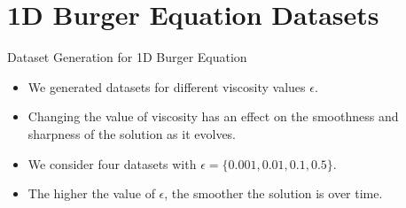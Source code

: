 \section{1D Burger Equation Datasets}

\begin{secframe}

\begin{block}{Dataset Generation for 1D Burger Equation}
\begin{itemize}
    \item We generated datasets for different viscosity values $\epsilon$.
    \item Changing the value of viscosity has an effect on the smoothness and sharpness of the solution as it evolves.
    \item We consider four datasets with $\epsilon = \{0.001, 0.01, 0.1, 0.5\}$.
    \item The higher the value of $\epsilon$, the smoother the solution is over time.
\end{itemize}
\end{block}

\end{secframe}

